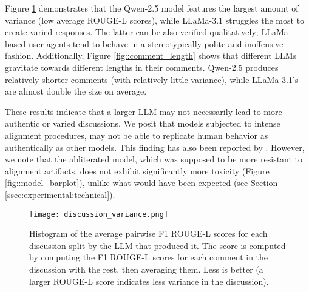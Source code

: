 Figure \ref{fig::discussion_variance} demonstrates that the Qwen-2.5 model features the largest amount of variance (low average ROUGE-L scores), while LLaMa-3.1 struggles the most to create varied responses. The latter can be also verified qualitatively; LLaMa-based user-agents tend to behave in a stereotypically polite and inoffensive fashion. Additionally, Figure \ref{fig::comment_length} shows that different \acp{LLM} gravitate towards different lengths in their comments. Qwen-2.5 produces relatively shorter comments (with relatively little variance), while LLaMa-3.1's are almost double the size on average.

These results indicate that a larger \ac{LLM} may not necessarily lead to more authentic or varied discussions. We posit that models subjected to intense alignment procedures, may not be able to replicate human behavior as authentically as other models. This finding has also been reported by \citet{Park2023GenerativeAI}. However, we note that the abliterated model, which was supposed to be more resistant to alignment artifacts, does not exhibit significantly more toxicity (Figure \ref{fig::model_barplot}), unlike what would have been expected (see Section \ref{ssec:experimental:technical}).

\begin{figure}
	\centering
	\texttt{[image: discussion\_variance.png]}
	\caption{Histogram of the average pairwise F1 ROUGE-L \cite{lin-2004-rouge} scores for each discussion split by the \ac{LLM} that produced it. The score is computed by computing the F1 ROUGE-L scores for each comment in the discussion with the rest, then averaging them. Less is better (a larger ROUGE-L score indicates less variance in the discussion).}
	\label{fig::discussion_variance}
\end{figure}



